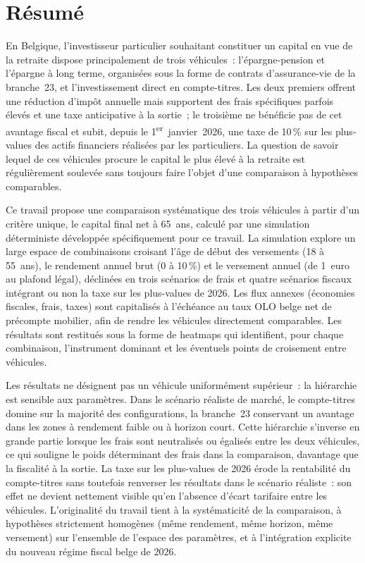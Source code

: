 ﻿\documentclass[12pt, a4paper]{article}
\begin{document}




\newpage
\pagestyle{empty}

\section*{Résumé}

En Belgique, l'investisseur particulier souhaitant constituer un capital en
vue de la retraite dispose principalement de trois véhicules~:
l'épargne-pension et l'épargne à long terme, organisées sous la forme de
contrats d'assurance-vie de la branche~23, et l'investissement direct en
compte-titres. Les deux premiers offrent une réduction d'impôt annuelle
mais supportent des frais spécifiques parfois élevés et une taxe anticipative à la sortie~; le
troisième ne bénéficie pas de cet avantage fiscal et subit, depuis le
1\textsuperscript{er}~janvier~2026, une taxe de 10\,\% sur les
plus-values des actifs financiers réalisées par les particuliers. La
question de savoir lequel de ces véhicules procure le capital le plus
élevé à la retraite est régulièrement soulevée sans toujours faire
l'objet d'une comparaison à hypothèses comparables.

Ce travail propose une comparaison systématique des trois véhicules à
partir d'un critère unique, le capital final net à 65~ans, calculé par
une simulation déterministe développée spécifiquement pour ce travail.
La simulation explore un large espace de combinaisons croisant l'âge de
début des versements (18 à 55~ans), le rendement annuel brut (0 à
10\,\%) et le versement annuel (de 1~euro au plafond légal), déclinées
en trois scénarios de frais et quatre scénarios fiscaux intégrant ou
non la taxe sur les plus-values de 2026. Les flux annexes (économies
fiscales, frais, taxes) sont capitalisés à l'échéance au taux OLO belge
net de précompte mobilier, afin de rendre les véhicules directement
comparables. Les résultats sont restitués sous la forme de heatmaps qui
identifient, pour chaque combinaison, l'instrument dominant et les
éventuels points de croisement entre véhicules.

Les résultats ne désignent pas un véhicule uniformément supérieur~: la
hiérarchie est sensible aux paramètres. Dans le scénario réaliste de
marché, le compte-titres domine sur la majorité des configurations, la
branche~23 conservant un avantage dans les zones à rendement faible ou
à horizon court. Cette hiérarchie s'inverse en grande partie lorsque
les frais sont neutralisés ou égalisés entre les deux véhicules, ce qui
souligne le poids déterminant des frais dans la comparaison, davantage
que la fiscalité à la sortie. La taxe sur les plus-values de 2026
érode la rentabilité du compte-titres sans toutefois renverser les
résultats dans le scénario réaliste~: son effet ne devient nettement
visible qu'en l'absence d'écart tarifaire entre les véhicules.
L'originalité du travail tient à la systématicité de la comparaison, à
hypothèses strictement homogènes (même rendement, même horizon, même
versement) sur l'ensemble de l'espace des paramètres, et à l'intégration
explicite du nouveau régime fiscal belge de 2026.
\end{document}
